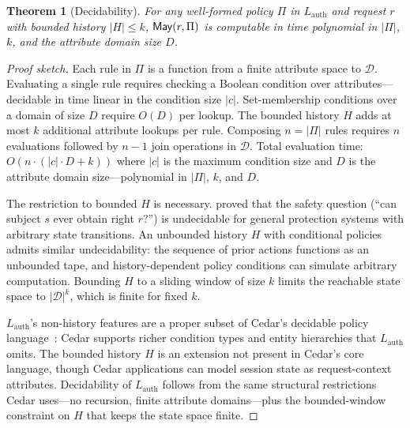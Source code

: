 \documentclass[11pt,a4paper]{article}
\newtheorem{theorem}[definition]{Theorem}
\newcommand{\termlabel}[1]{\ifmmode\mathsf{#1}\else{\normalfont\textsc{\MakeLowercase{#1}}}\fi}
\newcommand{\May}{\termlabel{May}}
\begin{document}
\begin{theorem}[Decidability]
\label{thm:decidability}
For any well-formed policy $\Pi$ in $L_{\mathrm{auth}}$ and request $r$ with bounded history $|H| \leq k$, $\May(r, \Pi)$ is computable in time polynomial in $|\Pi|$, $k$, and the attribute domain size $D$.
\end{theorem}

\begin{proof}[Proof sketch]
Each rule in $\Pi$ is a function from a finite attribute space to $\mathcal{D}$. Evaluating a single rule requires checking a Boolean condition over attributes---decidable in time linear in the condition size $|c|$. Set-membership conditions over a domain of size $D$ require $O(D)$ per lookup. The bounded history $H$ adds at most $k$ additional attribute lookups per rule. Composing $n = |\Pi|$ rules requires $n$ evaluations followed by $n-1$ join operations in $\mathcal{D}$. Total evaluation time: $O(n \cdot (|c| \cdot D + k))$ where $|c|$ is the maximum condition size and $D$ is the attribute domain size---polynomial in $|\Pi|$, $k$, and $D$.

The restriction to bounded $H$ is necessary. \citet{harrison1976protection} proved that the safety question (``can subject $s$ ever obtain right $r$?'') is undecidable for general protection systems with arbitrary state transitions. An unbounded history $H$ with conditional policies admits similar undecidability: the sequence of prior actions functions as an unbounded tape, and history-dependent policy conditions can simulate arbitrary computation. Bounding $H$ to a sliding window of size $k$ limits the reachable state space to $|\mathcal{D}|^k$, which is finite for fixed $k$.

$L_{\mathrm{auth}}$'s non-history features are a proper subset of Cedar's decidable policy language~\citep{cutler2024cedar}: Cedar supports richer condition types and entity hierarchies that $L_{\mathrm{auth}}$ omits. The bounded history $H$ is an extension not present in Cedar's core language, though Cedar applications can model session state as request-context attributes. Decidability of $L_{\mathrm{auth}}$ follows from the same structural restrictions Cedar uses---no recursion, finite attribute domains---plus the bounded-window constraint on $H$ that keeps the state space finite.
\end{proof}


\end{document}
